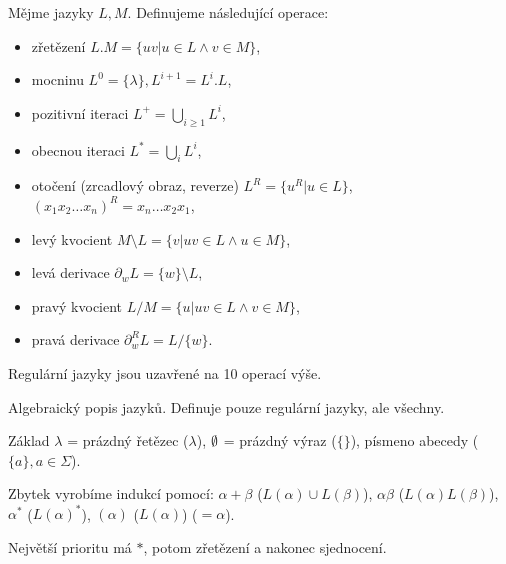 \documentclass[12pt]{article}                   %
\begin{document}
    \begin{definice}
        Mějme jazyky $L, M$. Definujeme následující operace:

        \begin{itemize}
            \item zřetězení $L.M = \{uv|u \in L \land v \in M\}$,
            \item mocninu $L^0 = \{\lambda\}, L^{i+1} = L^i.L$,
            \item pozitivní iteraci $L^+ = \bigcup_{i ≥ 1}L^i$,
            \item obecnou iteraci $L^* = \bigcup_i L^i$,
            \item otočení (zrcadlový obraz, reverze) $L^R = \{u^R|u \in L\}$, $(x_1x_2…x_n)^R = x_n…x_2x_1$,
            \item levý kvocient $M\setminus L = \{v|uv \in L \land u \in M\}$,
            \item levá derivace $\partial_w L = \{w\}\setminus L$,
            \item pravý kvocient $L/M = \{u|uv \in L \land v \in M\}$,
            \item pravá derivace $\partial^R_w L = L/\{w\}$.
        \end{itemize}
    \end{definice}

    \begin{veta}
        Regulární jazyky jsou uzavřené na 10 operací výše.
    \end{veta}


    \begin{definice}
        Algebraický popis jazyků. Definuje pouze regulární jazyky, ale všechny.

        Základ $\lambda$ = prázdný řetězec (${\lambda}$), $\emptyset$ = prázdný výraz ($\{\}$), písmeno abecedy ($\{a\}, a \in \Sigma$).

        Zbytek vyrobíme indukcí pomocí: $\alpha + \beta$ ($L(\alpha) \cup L(\beta)$), $\alpha\beta$ ($L(\alpha)L(\beta)$), $\alpha^*$ ($L(\alpha)^*$), $(\alpha)$ ($L(\alpha)$) ($= \alpha$).
    \end{definice}

    \begin{definice}[Priorita]
        Největší prioritu má $*$, potom zřetězení a nakonec sjednocení.
    \end{definice}
\end{document}
